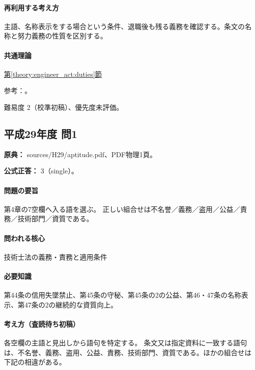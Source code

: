 \paragraph{再利用する考え方} 主語、名称表示をする場合という条件、退職後も残る義務を確認する。条文の名称と努力義務の性質を区別する。

\paragraph{共通理論} \hyperref[theory:engineer_act:duties]{第\ref*{theory:engineer_act:duties}節}

\par 参考：\cite{engineer_act_current}。

\par 難易度 2（校準初稿）、優先度未評価。

\subsection{平成29年度 問1}
\label{q:h29-reg-apt-01}

\noindent\textbf{原典：} sources/H29/aptitude.pdf、PDF物理1頁。

\textbf{公式正答：} 3（single）。

\paragraph{問題の要旨} 第4章の7空欄へ入る語を選ぶ。 正しい組合せは不名誉／義務／盗用／公益／責務／技術部門／資質である。

\paragraph{問われる核心} 技術士法の義務・責務と適用条件

\paragraph{必要知識} 第44条の信用失墜禁止、第45条の守秘、第45条の2の公益、第46・47条の名称表示、第47条の2の継続的な資質向上。

\paragraph{考え方（査読待ち初稿）} 各空欄の主語と見出しから語句を特定する。 条文又は指定資料に一致する語句は、不名誉、義務、盗用、公益、責務、技術部門、資質である。ほかの組合せは下記の相違がある。

